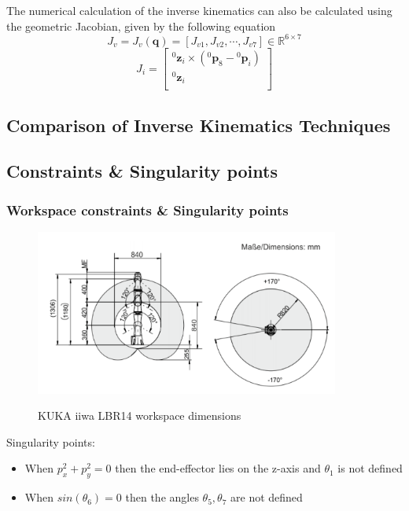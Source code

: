 The numerical calculation of the inverse kinematics can also be calculated using the geometric Jacobian, given by the following equation
\[
J_v = J_v( \mathbf{q} ) = [ J_{v1}, J_{v2}, \cdots, J_{v7} ] \in \mathbb{R}^{6 \times 7}
\]
\begin{equation}
J_i = \begin{bmatrix}
{}^0\mathbf{z}_i \times ({}^0\mathbf{p}_8 - {}^0\mathbf{p}_i) \\
{}^0\mathbf{z}_i \\
\end{bmatrix}
\end{equation}


\subsection{Comparison of Inverse Kinematics Techniques}


\subsection{Constraints \& Singularity points}

\subsubsection{Workspace constraints \& Singularity points}
\begin{center}
\begin{figure}[!htb]
\centering
\includegraphics[width=10cm]{images/iiwa-workspace.png}\\
\caption{KUKA iiwa LBR14 workspace dimensions}
\end{figure}
\end{center}

Singularity points:
\begin{itemize}
	\item When $p_x^2 + p_y^2 = 0$ then the end-effector lies on the z-axis and $θ_1$ is not defined
	\item When $sin\left( θ_6 \right) = 0$ then the angles $θ_5, θ_7$ are not defined
\end{itemize}

